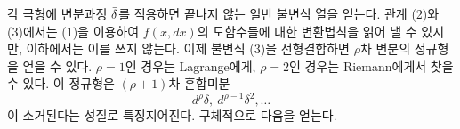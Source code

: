 각 극형에 변분과정 \(\bar{\delta}\)를 적용하면 끝나지 않는 일반 불변식 열을 얻는다.
관계 (2)와 (3)에서는 (1)을 이용하여 \(f(x,dx)\)의 도함수들에 대한 변환법칙을 읽어 낼 수 있지만, 이하에서는 이를 쓰지 않는다. 이제 불변식 (3)을 선형결합하면 \glqq{}\(\rho\)차 변분의 정규형\grqq{}을 얻을 수 있다. \(\rho=1\)인 경우는 Lagrange에게, \(\rho=2\)인 경우는 Riemann에게서 찾을 수 있다. 이 정규형은 \((\rho+1)\)차 혼합미분
\[
d^\rho\delta,\ d^{\rho-1}\delta^2,\ldots
\]
이 소거된다는 성질로 특징지어진다. 구체적으로 다음을 얻는다.

